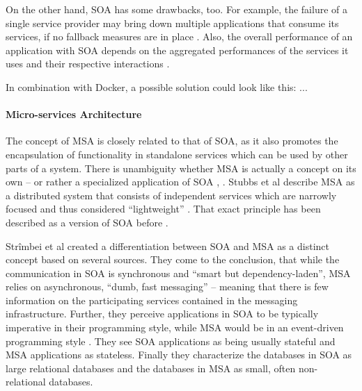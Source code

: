     On the other hand, \ac{SOA} has some drawbacks, too.
    For example, the failure of a single service provider may bring down multiple applications that consume its services, if no fallback measures are in place \cite[p.~408f]{Papazoglou2007Service}.
    Also, the overall performance of an application with \ac{SOA} depends on the aggregated performances of the services it uses and their respective interactions \cite[p.~408f]{Papazoglou2007Service}.

    In combination with Docker, a possible solution could look like this: ...

  \paragraph{Micro-services Architecture} %
    \label{par:micro_services_architecture}
    The concept of \ac{MSA} is closely related to that of \ac{SOA}, as it also promotes the encapsulation of functionality in standalone services which can be used by other parts of a system. There is unambiguity whether \ac{MSA} is actually a concept on its own -- or rather a specialized application of \ac{SOA} \cite[p.~35]{Stubbs2015Distributed}, \cite[p.~17]{Strimbei2015Software}.
    Stubbs et al describe \ac{MSA} as a distributed system that consists of independent services which are   narrowly focused and thus considered ``lightweight'' \cite[p.~35]{Stubbs2015Distributed}.
    That exact principle has been described as a version of \ac{SOA} before \cite[p.~395]{Papazoglou2007Service}.

    Strîmbei et al created a differentiation between SOA and MSA as a distinct concept based on several sources. They come to the conclusion, that while the communication in \ac{SOA} is synchronous and ``smart but dependency-laden'', \ac{MSA} relies on asynchronous, ``dumb, fast messaging'' -- meaning that there is few information on the participating services contained in the messaging infrastructure. Further, they perceive applications in \ac{SOA} to be typically imperative in their programming style, while \ac{MSA} would be in an event-driven programming style \cite[pp.~17-20]{Strimbei2015Software}. They see \ac{SOA} applications as being usually stateful and \ac{MSA} applications as stateless. Finally they characterize the databases in \ac{SOA} as large relational databases and the databases in \ac{MSA} as small, often non-relational databases.

